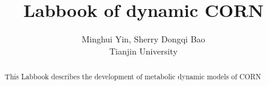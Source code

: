\documentclass[a4paper,10pt]{article}
\title{Labbook of dynamic CORN}
\author{Minghui Yin, Sherry Dongqi Bao \\ Tianjin University}
\begin{document}
\maketitle

\begin{abstract}
This Labbook describes the development of metabolic dynamic models of CORN
\end{abstract}


%

\printbibliography
\end{document}
